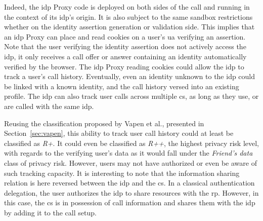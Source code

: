 Indeed, the \gls{idp} Proxy code is deployed on both sides of the call and running in the context of its \gls{idp}'s origin.
It is also subject to the same sandbox restrictions whether on the identity assertion generation or validation side.
This implies that an \gls{idp} Proxy can place and read cookies on a user's \gls{ua} verifying an assertion.
Note that the user verifying the identity assertion does not actively access the \gls{idp}, it only receives a call offer or answer containing an identity automatically verified by the browser.
The \gls{idp} Proxy reading cookies could allow the \gls{idp} to track a user's call history.
Eventually, even an identity unknown to the \gls{idp} could be linked with a known identity, and the call history versed into an existing profile.
The \gls{idp} can also track user calls across multiple \gls{cs}, as long as they use, or are called with the same \gls{idp}. 


Reusing the classification proposed by Vapen et al., presented in Section~\ref{sec:vapen}, this ability to track user call history could at least be classified as \textit{R+}.
It could even be classified as \textit{R++}, the highest privacy risk level, with regards to the verifying user's data as it would fall under the \textit{Friend's data} class of privacy risk.
However, users may not have authorized or even be aware of such tracking capacity.
It is interesting to note that the information sharing relation is here reversed between the \gls{idp} and the \gls{cs}.
In a classical authentication delegation, the user authorizes the \gls{idp} to share resources with the \gls{rp}.
However, in this case, the \gls{cs} is in possession of call information and shares them with the \gls{idp} by adding it to the call setup.

